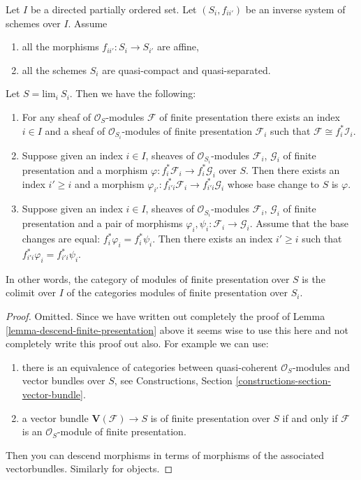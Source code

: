 \begin{lemma}
\label{lemma-descend-modules-finite-presentation}
Let $I$ be a directed partially ordered set.
Let $(S_i, f_{ii'})$ be an inverse system of schemes over $I$.
Assume
\begin{enumerate}
\item all the morphisms $f_{ii'} : S_i \to S_{i'}$ are affine,
\item all the schemes $S_i$ are quasi-compact and quasi-separated.
\end{enumerate}
Let $S = \text{lim}_i\ S_i$. Then we have the following:
\begin{enumerate}
\item For any sheaf of $\mathcal{O}_S$-modules
$\mathcal{F}$ of finite presentation there exists an index
$i \in I$ and a sheaf of $\mathcal{O}_{S_i}$-modules of finite
presentation $\mathcal{F}_i$ such that
$\mathcal{F} \cong f_i^*\mathcal{I}_i$.
\item Suppose given an index $i \in I$, sheaves
of $\mathcal{O}_{S_i}$-modules $\mathcal{F}_i$, $\mathcal{G}_i$
of finite presentation and a morphism
$\varphi : f_i^*\mathcal{F}_i \to f_i^*\mathcal{G}_i$ over $S$.
Then there exists an index $i' \geq i$ and a morphism
$\varphi_{i'} : f_{i'i}^*\mathcal{F}_i \to f_{i'i}^*\mathcal{G}_i$
whose base change to $S$ is $\varphi$.
\item Suppose given an index $i \in I$, sheaves of $\mathcal{O}_{S_i}$-modules
$\mathcal{F}_i$, $\mathcal{G}_i$ of finite presentation
and a pair of morphisms $\varphi_i, \psi_i : \mathcal{F}_i \to \mathcal{G}_i$.
Assume that the base changes are equal: $f_i^*\varphi_i = f_i^*\psi_i$.
Then there exists an index $i' \geq i$ such that
$f_{i'i}^*\varphi_i = f_{i'i}^*\psi_i$.
\end{enumerate}
In other words, the category of modules
of finite presentation over $S$ is the colimit over $I$
of the categories modules of finite presentation over $S_i$.
\end{lemma}

\begin{proof}
Omitted. Since we have written out completely the proof of
Lemma \ref{lemma-descend-finite-presentation} above
it seems wise to use this here and not completely write this
proof out also. For example we can use:
\begin{enumerate}
\item there is an equivalence of categories
between quasi-coherent $\mathcal{O}_S$-modules and
vector bundles over $S$, see
Constructions, Section \ref{constructions-section-vector-bundle}.
\item a vector bundle $\mathbf{V}(\mathcal{F}) \to S$ is 
of finite presentation over $S$ if and only if $\mathcal{F}$
is an $\mathcal{O}_S$-module of finite presentation.
\end{enumerate}
Then you can descend morphisms in terms of morphisms of the
associated vectorbundles. Similarly for objects.
\end{proof}













